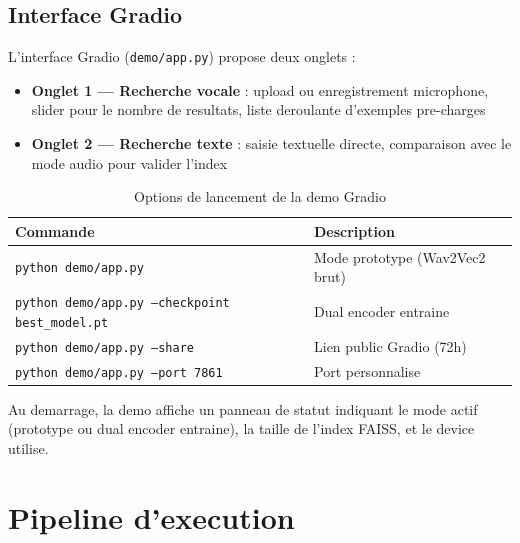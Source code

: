 \documentclass[12pt, a4paper]{article}
\begin{document}
\subsection{Interface Gradio}

L'interface Gradio (\texttt{demo/app.py}) propose deux onglets :

\begin{itemize}[leftmargin=1.5cm]
  \item \textbf{Onglet 1 --- Recherche vocale} : upload ou enregistrement microphone,
        slider pour le nombre de resultats, liste deroulante d'exemples pre-charges
  \item \textbf{Onglet 2 --- Recherche texte} : saisie textuelle directe,
        comparaison avec le mode audio pour valider l'index
\end{itemize}

\begin{table}[H]
\centering
\caption{Options de lancement de la demo Gradio}
\begin{tabular}{l l}
\toprule
\textbf{Commande} & \textbf{Description} \\
\midrule
\texttt{python demo/app.py} & Mode prototype (Wav2Vec2 brut) \\
\rowcolor{silver}
\texttt{python demo/app.py --checkpoint best\_model.pt} & Dual encoder entraine \\
\texttt{python demo/app.py --share} & Lien public Gradio (72h) \\
\rowcolor{silver}
\texttt{python demo/app.py --port 7861} & Port personnalise \\
\bottomrule
\end{tabular}
\end{table}

Au demarrage, la demo affiche un panneau de statut indiquant le mode actif
(prototype ou dual encoder entraine), la taille de l'index FAISS, et le device utilise.

\newpage

\section{Pipeline d'execution}

\end{document}
